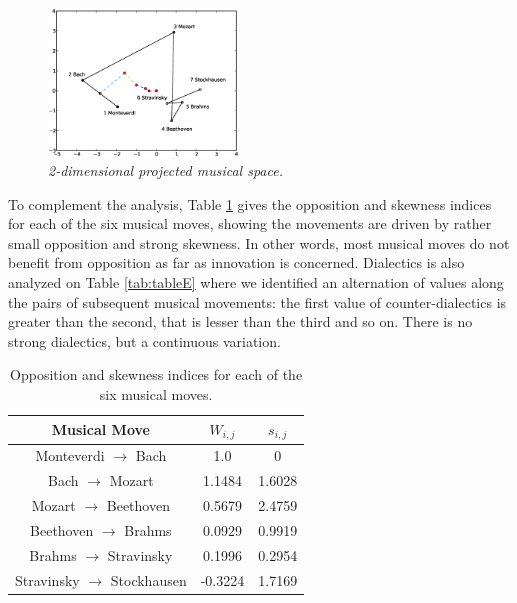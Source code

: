 \documentclass[
 aip,
 jmp,
 amsmath,amssymb,
 reprint,
]{revtex4-1}
\begin{document}
\begin{figure}[ht]
  \begin{center}
    \includegraphics[width=0.45\textwidth]{images/g1}
  \end{center}
  \caption{\it 2-dimensional projected musical space.}
  \label{fig:pca}
\end{figure}


To complement the analysis, Table \ref{tab:tableOI} gives the
opposition and skewness indices for each of the six musical moves,
showing the movements are driven by rather small opposition and strong
skewness. In other words, most musical moves do not benefit from
opposition as far as innovation is concerned. Dialectics is also analyzed on Table
\ref{tab:tableE} where we identified an alternation of values along
the pairs of subsequent musical movements: the first value of
counter-dialectics is greater than the second, that is lesser than the
third and so on. There is no strong
dialectics, but a continuous variation.

\begin{table}[ht]
\caption{\label{tab:tableOI}Opposition and skewness indices for each
of the six musical moves.}

\begin{tabular}{|c||c|c|}
\hline
Musical Move & $W_{i,j}$ & $s_{i,j}$ \\
\hline \hline

 Monteverdi $\to$ Bach             &   1.0     &  0       \\
 Bach $\to$ Mozart                 &   1.1484  &  1.6028  \\
 Mozart $\to$ Beethoven            &   0.5679  &  2.4759  \\
 Beethoven $\to$ Brahms            &   0.0929  &  0.9919  \\
 Brahms $\to$ Stravinsky           &   0.1996  &  0.2954  \\
 Stravinsky $\to$ Stockhausen      &  -0.3224  &  1.7169  \\

\hline
\end{tabular}
\end{table}
\end{document}
